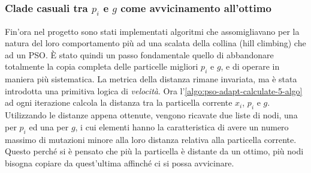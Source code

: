 \subsubsection{Clade casuali tra $p_i$ e $g$ come avvicinamento all'ottimo}
\label{chap:pso-adapt-calculate-5}
Fin'ora nel progetto sono stati implementati algoritmi che assomigliavano per la natura del loro comportamento più ad una scalata della collina (hill climbing) che ad un PSO. È stato quindi un passo fondamentale quello di abbandonare totalmente la copia completa delle particelle migliori $p_i$ e $g$, e di operare in maniera più sistematica.
La metrica della distanza rimane invariata, ma è stata introdotta una primitiva logica di \textit{velocità}. Ora l'\autoref{algo:pso-adapt-calculate-5-algo} ad ogni iterazione calcola la distanza tra la particella corrente $x_i$, $p_i$ e $g$. Utilizzando le distanze appena ottenute, vengono ricavate due liste di nodi, una per $p_i$ ed una per $g$, i cui elementi hanno la caratteristica di avere un numero massimo di mutazioni minore alla loro distanza relativa alla particella corrente. Questo perché si è pensato che più la particella è distante da un ottimo, più nodi bisogna copiare da quest'ultima affinché ci si possa avvicinare.


